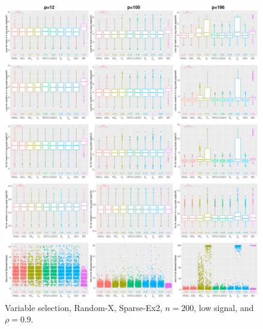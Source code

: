 \begin{figure}[!ht]
\centering
\includegraphics[width=\textwidth]{figures/supplement/randomx/subset_selection/Sparse-Ex2_n200_lsnr_rho09.eps}
\caption{Variable selection, Random-X, Sparse-Ex2, $n=200$, low signal, and $\rho=0.9$.}
\end{figure}
\clearpage
